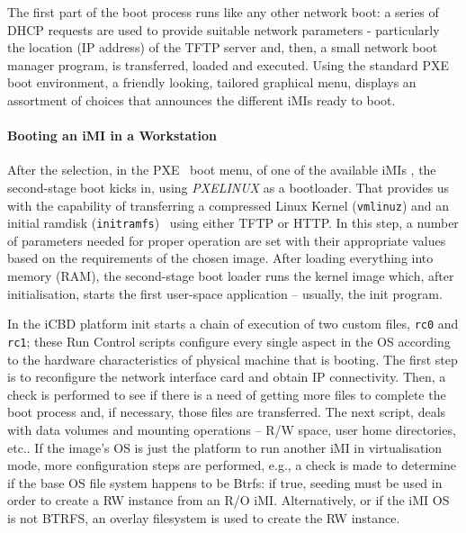 The first part of the boot process runs like any other network boot: a series of DHCP requests are used to provide suitable network parameters - particularly the location (IP address) of the TFTP server and, then, a small network boot manager program, is transferred, loaded and executed. Using the standard PXE boot environment, a friendly looking, tailored graphical menu, displays an assortment of choices that announces the different iMIs ready to boot.

\paragraph{Booting an iMI in a Workstation}
\label{subsub:icbd_booting_imi}

After the selection, in the PXE~\cite{ibm_linux_boot} boot menu, of one of the available iMIs , the second-stage boot kicks in, using \textit{PXELINUX} as a bootloader. That provides us with the capability of transferring a compressed Linux Kernel (\texttt{vmlinuz}) and an initial ramdisk (\texttt{initramfs})~\cite{ibm_initrd} using either TFTP or HTTP. In this step, a number of parameters needed for proper operation are set with their appropriate values based on the requirements of the chosen image. After loading everything into memory (RAM), the second-stage boot loader runs the kernel image which, after initialisation, starts the first user-space application – usually, the init program.

In the iCBD platform init starts a chain of execution of two custom files, \texttt{rc0} and \texttt{rc1}; these Run Control scripts configure every single aspect in the OS according to the hardware characteristics of physical machine that is booting. The first step is to reconfigure the network interface card and obtain IP connectivity. Then, a check is performed to see if there is a need of getting more files to complete the boot process and, if necessary, those files are transferred. The next script, deals with data volumes and mounting operations – R/W space, user home directories, etc.. If the image’s OS is just the platform to run another iMI in virtualisation mode, more configuration steps are performed, e.g., a check is made to determine if the base OS file system happens to be Btrfs: if true, seeding must be used in order to create a R\/W instance from an R/O iMI. Alternatively, or if the iMI OS is not BTRFS, an overlay filesystem is used to create the R\/W instance.

